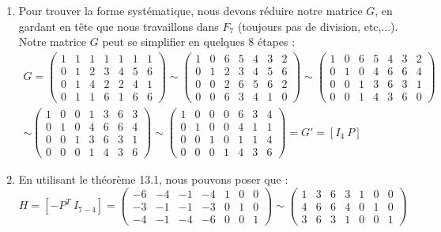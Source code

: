 \documentclass[10p,a4paper]{scrartcl}
\renewcommand{\(}{\left(}
\renewcommand{\)}{\right)}
\begin{document}
\begin{enumerate}
			
	\item	Pour trouver la forme systématique, nous devons réduire notre matrice $G$, en gardant en tête que nous travaillons dans $F_7$ (toujours pas de division, etc,...). Notre matrice $G$ peut se simplifier en quelques 8 étapes :
			\begin{align*}
				G = \begin{pmatrix}
					1 & 1 & 1 & 1 & 1 & 1 & 1\\
					0 & 1 & 2 & 3 & 4 & 5 & 6\\
					0 & 1 & 4 & 2 & 2 & 4 & 1\\
					0 & 1 & 1 & 6 & 1 & 6 & 6
				\end{pmatrix} 
				\sim 
				\begin{pmatrix}
					1 & 0 & 6 & 5 & 4 & 3 & 2\\
					0 & 1 & 2 & 3 & 4 & 5 & 6\\
					0 & 0 & 2 & 6 & 5 & 6 & 2\\
					0 & 0 & 6 & 3 & 4 & 1 & 0
				\end{pmatrix} 
				\sim
				\begin{pmatrix}
					1 & 0 & 6 & 5 & 4 & 3 & 2\\
					0 & 1 & 0 & 4 & 6 & 6 & 4\\
					0 & 0 & 1 & 3 & 6 & 3 & 1\\
					0 & 0 & 1 & 4 & 3 & 6 & 0
				\end{pmatrix}
				\\
				\sim 
				\begin{pmatrix}
					1 & 0 & 0 & 1 & 3 & 6 & 3\\
					0 & 1 & 0 & 4 & 6 & 6 & 4\\
					0 & 0 & 1 & 3 & 6 & 3 & 1\\
					0 & 0 & 0 & 1 & 4 & 3 & 6
				\end{pmatrix}
				\sim
				\begin{pmatrix}
					1 & 0 & 0 & 0 & 6 & 3 & 4\\
					0 & 1 & 0 & 0 & 4 & 1 & 1\\
					0 & 0 & 1 & 0 & 1 & 1 & 4\\
					0 & 0 & 0 & 1 & 4 & 3 & 6
				\end{pmatrix} = G' = [I_4 \ P]
			\end{align*}
			
	\item	En utilisant le théorème 13.1, nous pouvons poser que :
			\[H = [-P^T \ I_{7-4}] = 
			\begin{pmatrix}
				-6 & -4 & -1 & -4 & 1 & 0 & 0\\
				-3 & -1 & -1 & -3 & 0 & 1 & 0\\
				-4 & -1 & -4 & -6 & 0 & 0 & 1
			\end{pmatrix} \sim
			\begin{pmatrix}
			1 & 3 & 6 & 3 & 1 & 0 & 0\\
			4 & 6 & 6 & 4 & 0 & 1 & 0\\
			3 & 6 & 3 & 1 & 0 & 0 & 1
			\end{pmatrix}\]
			

\end{enumerate}
\end{document}
